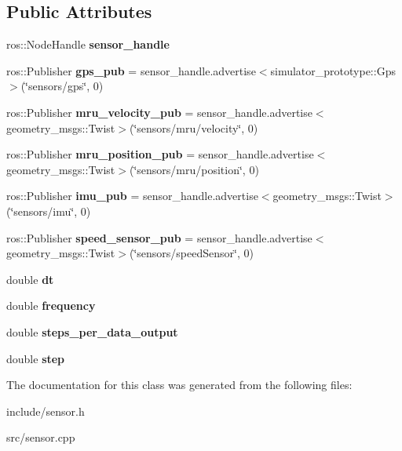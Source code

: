 \subsection*{Public Attributes}
\begin{DoxyCompactItemize}
\item 
ros\+::\+Node\+Handle {\bfseries sensor\+\_\+handle}\label{class_sensor_a3b3c9b96c4ed4ff563181b74fc518b5c}

\item 
ros\+::\+Publisher {\bfseries gps\+\_\+pub} = sensor\+\_\+handle.\+advertise$<$simulator\+\_\+prototype\+::\+Gps$>$(\char`\"{}sensors/gps\char`\"{}, 0)\label{class_sensor_a811e9071506ad8925dba54b9e40ab5a2}

\item 
ros\+::\+Publisher {\bfseries mru\+\_\+velocity\+\_\+pub} = sensor\+\_\+handle.\+advertise$<$geometry\+\_\+msgs\+::\+Twist$>$(\char`\"{}sensors/mru/velocity\char`\"{}, 0)\label{class_sensor_a56727fc8fe63502e44d365297b5666ea}

\item 
ros\+::\+Publisher {\bfseries mru\+\_\+position\+\_\+pub} = sensor\+\_\+handle.\+advertise$<$geometry\+\_\+msgs\+::\+Twist$>$(\char`\"{}sensors/mru/position\char`\"{}, 0)\label{class_sensor_a08cb49aa8df3a84c5bb5546b1c11323e}

\item 
ros\+::\+Publisher {\bfseries imu\+\_\+pub} = sensor\+\_\+handle.\+advertise$<$geometry\+\_\+msgs\+::\+Twist$>$(\char`\"{}sensors/imu\char`\"{}, 0)\label{class_sensor_ab2f14e6d6c5a19338689e7af04fff45e}

\item 
ros\+::\+Publisher {\bfseries speed\+\_\+sensor\+\_\+pub} = sensor\+\_\+handle.\+advertise$<$geometry\+\_\+msgs\+::\+Twist$>$(\char`\"{}sensors/speed\+Sensor\char`\"{}, 0)\label{class_sensor_afc9a4388ae0a7d8bec357af261e9c4a8}

\item 
double {\bfseries dt}\label{class_sensor_ae6f4e03bbd96a9c020ee0b737c23a7bf}

\item 
double {\bfseries frequency}\label{class_sensor_a9cc770795c32650dc738d52e900c7c37}

\item 
double {\bfseries steps\+\_\+per\+\_\+data\+\_\+output}\label{class_sensor_a3409fcd46e7ba87534325b78b40a93d2}

\item 
double {\bfseries step}\label{class_sensor_a2a9811c9f9fc04523f98276fdc794219}

\end{DoxyCompactItemize}


The documentation for this class was generated from the following files\+:\begin{DoxyCompactItemize}
\item 
include/sensor.\+h\item 
src/sensor.\+cpp\end{DoxyCompactItemize}
